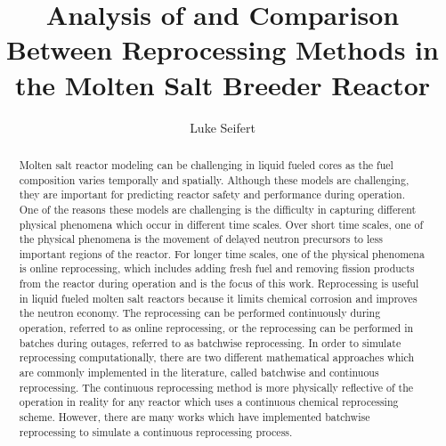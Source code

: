\documentclass[edeposit,fullpage,hidelinks]{uiucthesis2018}
\title{Analysis of and Comparison Between Reprocessing Methods in the Molten Salt Breeder Reactor}
\author{Luke Seifert}
\begin{document}
\maketitle

\frontmatter
\begin{abstract}

Molten salt reactor modeling can be challenging in liquid fueled cores as the fuel composition varies temporally and spatially.
Although these models are challenging, they are important for predicting reactor safety and performance during operation.
One of the reasons these models are challenging is the difficulty in capturing different physical phenomena which occur in different time scales.
Over short time scales, one of the physical phenomena is the movement of delayed neutron precursors to less important regions of the reactor.
For longer time scales, one of the physical phenomena is online reprocessing, which includes adding fresh fuel and removing fission products from the reactor during operation and is the focus of this work.
Reprocessing is useful in liquid fueled molten salt reactors because it limits chemical corrosion and improves the neutron economy.
The reprocessing can be performed continuously during operation, referred to as online reprocessing, or the reprocessing can be performed in batches during outages, referred to as batchwise reprocessing.
In order to simulate reprocessing computationally, there are two different mathematical approaches which are commonly implemented in the literature, called batchwise and continuous reprocessing.
The continuous reprocessing method is more physically reflective of the operation in reality for any reactor which uses a continuous chemical reprocessing scheme.
However, there are many works which have implemented batchwise reprocessing to simulate a continuous reprocessing process.

\end{abstract}
\end{document}
